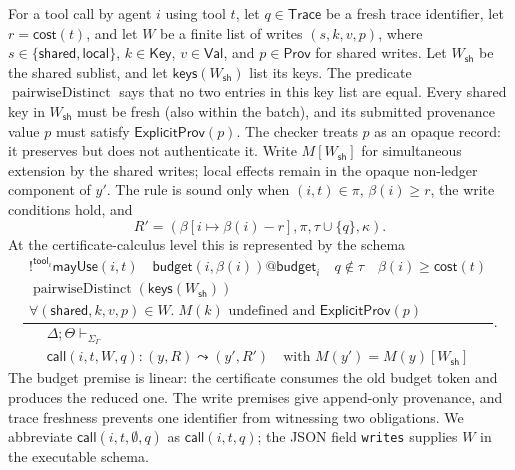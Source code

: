 \documentclass[a4paper,fleqn]{cas-sc}
\newcommand{\Trace}{\mathsf{Trace}}
\newcommand{\cost}{\mathsf{cost}}
\newcommand{\Key}{\mathsf{Key}}
\newcommand{\Val}{\mathsf{Val}}
\newcommand{\Prov}{\mathsf{Prov}}
\begin{document}
For a tool call by agent \(i\) using tool \(t\), let \(q\in\Trace\) be a fresh
trace identifier, let \(r=\cost(t)\), and let \(W\) be a finite list of writes
\((s,k,v,p)\), where \(s\in\{\mathsf{shared},\mathsf{local}\}\),
\(k\in\Key\), \(v\in\Val\), and \(p\in\Prov\) for shared writes. Let
\(W_{\mathsf{sh}}\) be the shared sublist, and let
\(\mathsf{keys}(W_{\mathsf{sh}})\) list its keys. The predicate
\(\operatorname{pairwiseDistinct}\) says that no two entries in this key list
are equal. Every shared key in
\(W_{\mathsf{sh}}\) must be fresh (also within the batch), and its submitted
provenance value \(p\) must satisfy \(\mathsf{ExplicitProv}(p)\). The checker
treats \(p\) as an opaque record: it preserves but does not authenticate it.
Write \(M[W_{\mathsf{sh}}]\) for simultaneous extension by the shared writes;
local effects remain in the opaque non-ledger component of \(y'\). The rule is
sound only when \((i,t)\in\pi\), \(\beta(i)\ge r\), the write conditions hold,
and
\[
  R'=(\beta[i\mapsto\beta(i)-r],\pi,\tau\cup\{q\},\kappa).
\]
At the certificate-calculus level this is represented by the schema
\[
\frac{
  \begin{gathered}
  !^{\mathsf{tool}_i}\mathsf{mayUse}(i,t)
  \quad \mathsf{budget}(i,\beta(i))@\mathsf{budget}_i
  \quad q\notin\tau \quad \beta(i)\ge \cost(t)\\
  \operatorname{pairwiseDistinct}(\mathsf{keys}(W_{\mathsf{sh}}))\\
  \forall(\mathsf{shared},k,v,p)\in W.\;M(k)\text{ undefined and }\mathsf{ExplicitProv}(p)
  \end{gathered}
}{
  \begin{gathered}
  \Delta;\Theta\vdash_{\Sigma_{\Gamma}}\\
  \mathsf{call}(i,t,W,q):(y,R)\leadsto(y',R')
  \quad\text{with }M(y')=M(y)[W_{\mathsf{sh}}]
  \end{gathered}
}.
\]
The budget premise is linear: the certificate consumes the old budget token and produces the reduced one. The write premises give append-only provenance, and trace freshness prevents one identifier from witnessing two obligations. We abbreviate \(\mathsf{call}(i,t,\emptyset,q)\) as \(\mathsf{call}(i,t,q)\); the JSON field \texttt{writes} supplies \(W\) in the executable schema.
\end{document}
